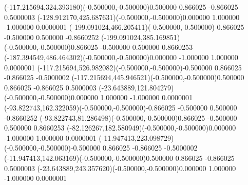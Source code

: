 \fontsize{12.000000}{14.400000}\selectfont
\ASYalignT(-117.215694,324.393180)(-0.500000,-0.500000){0.500000 0.866025 -0.866025 0.500000}{3}%
\color{ASYcolor}
\fontsize{12.000000}{14.400000}\selectfont
\ASYalignT(-128.912170,425.687631)(-0.500000,-0.500000){0.000000 1.000000 -1.000000 0.000000}{1}%
\color{ASYcolor}
\fontsize{12.000000}{14.400000}\selectfont
\ASYalignT(-199.091024,466.205411)(-0.500000,-0.500000){-0.866025 -0.500000 0.500000 -0.866025}{2}%
\color{ASYcolor}
\fontsize{12.000000}{14.400000}\selectfont
\ASYalignT(-199.091024,385.169851)(-0.500000,-0.500000){0.866025 -0.500000 0.500000 0.866025}{3}%
\color{ASYcolor}
\fontsize{12.000000}{14.400000}\selectfont
\ASYalignT(-187.394549,486.464302)(-0.500000,-0.500000){0.000000 -1.000000 1.000000 0.000000}{1}%
\color{ASYcolor}
\fontsize{12.000000}{14.400000}\selectfont
\ASYalignT(-117.215694,526.982082)(-0.500000,-0.500000){-0.500000 0.866025 -0.866025 -0.500000}{2}%
\color{ASYcolor}
\fontsize{12.000000}{14.400000}\selectfont
\ASYalignT(-117.215694,445.946521)(-0.500000,-0.500000){0.500000 0.866025 -0.866025 0.500000}{3}%
\color{ASYcolor}
\fontsize{12.000000}{14.400000}\selectfont
\ASYalignT(-23.643889,121.804279)(-0.500000,-0.500000){0.000000 1.000000 -1.000000 0.000000}{1}%
\color{ASYcolor}
\fontsize{12.000000}{14.400000}\selectfont
\ASYalignT(-93.822743,162.322059)(-0.500000,-0.500000){-0.866025 -0.500000 0.500000 -0.866025}{2}%
\color{ASYcolor}
\fontsize{12.000000}{14.400000}\selectfont
\ASYalignT(-93.822743,81.286498)(-0.500000,-0.500000){0.866025 -0.500000 0.500000 0.866025}{3}%
\color{ASYcolor}
\fontsize{12.000000}{14.400000}\selectfont
\ASYalignT(-82.126267,182.580949)(-0.500000,-0.500000){0.000000 -1.000000 1.000000 0.000000}{1}%
\color{ASYcolor}
\fontsize{12.000000}{14.400000}\selectfont
\ASYalignT(-11.947413,223.098729)(-0.500000,-0.500000){-0.500000 0.866025 -0.866025 -0.500000}{2}%
\color{ASYcolor}
\fontsize{12.000000}{14.400000}\selectfont
\ASYalignT(-11.947413,142.063169)(-0.500000,-0.500000){0.500000 0.866025 -0.866025 0.500000}{3}%
\color{ASYcolor}
\fontsize{12.000000}{14.400000}\selectfont
\ASYalignT(-23.643889,243.357620)(-0.500000,-0.500000){0.000000 1.000000 -1.000000 0.000000}{1}%

